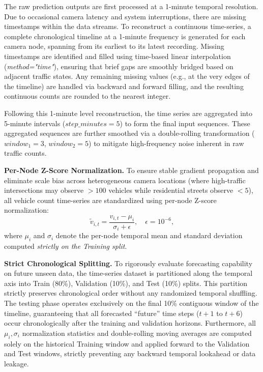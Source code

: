 \documentclass[journal,twocolumn]{IEEEtran}
\begin{document}
The raw prediction outputs are first processed at a 1-minute temporal resolution. Due to occasional camera latency and system interruptions, there are missing timestamps within the data streams. To reconstruct a continuous time-series, a complete chronological timeline at a 1-minute frequency is generated for each camera node, spanning from its earliest to its latest recording. Missing timestamps are identified and filled using time-based linear interpolation (\textit{method="time"}), ensuring that brief gaps are smoothly bridged based on adjacent traffic states. Any remaining missing values (e.g., at the very edges of the timeline) are handled via backward and forward filling, and the resulting continuous counts are rounded to the nearest integer.

Following this 1-minute level reconstruction, the time series are aggregated into 5-minute intervals ($step\_minutes=5$) to form the final input sequences. These aggregated sequences are further smoothed via a double-rolling transformation ($window_1=3$, $window_2=5$) to mitigate high-frequency noise inherent in raw traffic counts.

\textbf{Per-Node Z-Score Normalization.} To ensure stable gradient propagation and eliminate scale bias across heterogeneous camera locations (where high-traffic intersections may observe $>100$ vehicles while residential streets observe $<5$), all vehicle count time-series are standardized using per-node Z-score normalization:
\begin{equation}
\tilde{v}_{i,t} = \frac{v_{i,t} - \mu_i}{\sigma_i + \epsilon}, \quad \epsilon = 10^{-6},
\end{equation}
where $\mu_i$ and $\sigma_i$ denote the per-node temporal mean and standard deviation computed \emph{strictly on the Training split}. 

\textbf{Strict Chronological Splitting.} To rigorously evaluate forecasting capability on future unseen data, the time-series dataset is partitioned along the temporal axis into Train (80\%), Validation (10\%), and Test (10\%) splits. This partition strictly preserves chronological order without any randomized temporal shuffling. The testing phase operates exclusively on the final 10\% contiguous window of the timeline, guaranteeing that all forecasted ``future'' time steps ($t+1$ to $t+6$) occur chronologically after the training and validation horizons. Furthermore, all $\mu_i, \sigma_i$ normalization statistics and double-rolling moving averages are computed solely on the historical Training window and applied forward to the Validation and Test windows, strictly preventing any backward temporal lookahead or data leakage.
\end{document}
